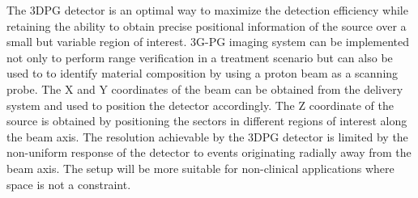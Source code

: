 \documentclass[11pt,a4paper]{article}
\begin{document}
The 3DPG detector is an optimal way to maximize the detection efficiency while retaining the ability to obtain precise positional information of the source over a small but variable region of interest. 3G-PG imaging system can be implemented not only to perform range verification in a treatment scenario but can also be used to to identify material composition by using a proton beam as a scanning probe. The X and Y coordinates of the  beam can be obtained from the delivery system and used to position the detector accordingly. The Z coordinate of the source is obtained by positioning the sectors in different regions of interest along  the beam axis. The resolution achievable by the 3DPG detector is limited by the non-uniform response of the detector to events originating radially away from the beam axis. The setup will be more suitable for non-clinical applications where space is not a constraint.
\end{document}
